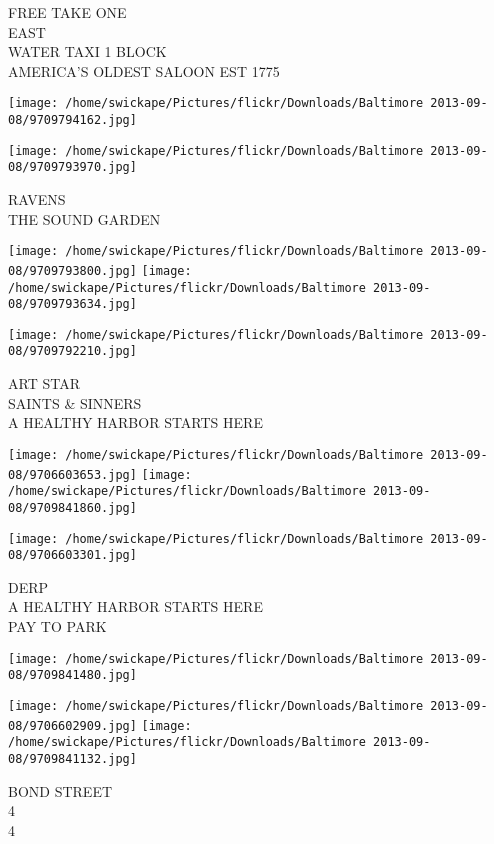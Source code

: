 \documentclass[10pt,letterpaper]{article}
\begin{document}
FREE TAKE ONE\\
EAST\\
WATER TAXI 1 BLOCK\\
AMERICA'S OLDEST SALOON EST 1775
\pagebreak

\texttt{[image: /home/swickape/Pictures/flickr/Downloads/Baltimore 2013-09-08/9709794162.jpg]}

\vspace{0.25in}
\texttt{[image: /home/swickape/Pictures/flickr/Downloads/Baltimore 2013-09-08/9709793970.jpg]}

RAVENS\\
THE SOUND GARDEN
\pagebreak

\texttt{[image: /home/swickape/Pictures/flickr/Downloads/Baltimore 2013-09-08/9709793800.jpg]}
\texttt{[image: /home/swickape/Pictures/flickr/Downloads/Baltimore 2013-09-08/9709793634.jpg]}

\vspace{0.25in}
\texttt{[image: /home/swickape/Pictures/flickr/Downloads/Baltimore 2013-09-08/9709792210.jpg]}

ART STAR\\
SAINTS \& SINNERS\\
A HEALTHY HARBOR STARTS HERE
\pagebreak

\texttt{[image: /home/swickape/Pictures/flickr/Downloads/Baltimore 2013-09-08/9706603653.jpg]}
\texttt{[image: /home/swickape/Pictures/flickr/Downloads/Baltimore 2013-09-08/9709841860.jpg]}

\texttt{[image: /home/swickape/Pictures/flickr/Downloads/Baltimore 2013-09-08/9706603301.jpg]}

DERP\\
A HEALTHY HARBOR STARTS HERE\\
PAY TO PARK
\pagebreak

\texttt{[image: /home/swickape/Pictures/flickr/Downloads/Baltimore 2013-09-08/9709841480.jpg]}

\vspace{0.25in}
\texttt{[image: /home/swickape/Pictures/flickr/Downloads/Baltimore 2013-09-08/9706602909.jpg]}
\texttt{[image: /home/swickape/Pictures/flickr/Downloads/Baltimore 2013-09-08/9709841132.jpg]}

BOND STREET\\
4\\
4
\pagebreak
\end{document}
